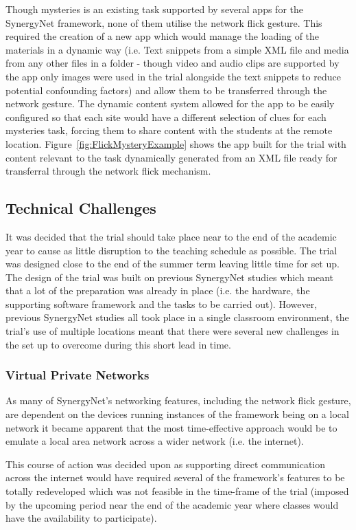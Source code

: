 \documentclass[a4paper,11pt]{article}
\begin{document}
Though mysteries is an existing task supported by several apps for the SynergyNet framework, none of them utilise the network flick gesture.
This required the creation of a new app which would manage the loading of the materials in a dynamic way (i.e. Text snippets from a simple XML file and media from any other files in a folder - though video and audio clips are supported by the app only images were used in the trial alongside the text snippets to reduce potential confounding factors) and allow them to be transferred through the network gesture.
The dynamic content system allowed for the app to be easily configured so that each site would have a different selection of clues for each mysteries task, forcing them to share content with the students at the remote location.
Figure~\ref{fig:FlickMysteryExample} shows the app built for the trial with content relevant to the task dynamically generated from an XML file ready for transferral through the network flick mechanism.

\subsection{Technical Challenges}

It was decided that the trial should take place near to the end of the academic year to cause as little disruption to the teaching schedule as possible.
The trial was designed close to the end of the summer term leaving little time for set up.
The design of the trial was built on previous SynergyNet studies which meant that a lot of the preparation was already in place (i.e. the hardware, the supporting software framework and the tasks to be carried out).
However, previous SynergyNet studies all took place in a single classroom environment, the trial's use of multiple locations meant that there were several new challenges in the set up to overcome during this short lead in time.

\subsubsection{Virtual Private Networks}

As many of SynergyNet’s networking features, including the network flick gesture, are dependent on the devices running instances of the framework being on a local network it became apparent that the most time-effective approach would be to emulate a local area network across a wider network (i.e. the internet).

This course of action was decided upon as supporting direct communication across the internet would have required several of the framework’s features to be totally redeveloped which was not feasible in the time-frame of the trial (imposed by the upcoming period near the end of the academic year where classes would have the availability to participate).
\end{document}
